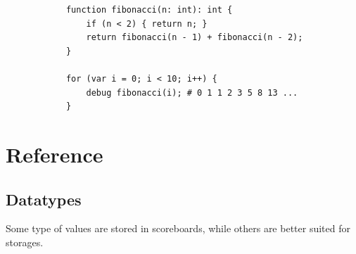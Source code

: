\documentclass[12pt]{article}
\begin{document}
		\begin{lstlisting}
		    function fibonacci(n: int): int {
		        if (n < 2) { return n; }
		        return fibonacci(n - 1) + fibonacci(n - 2);
		    }
		    
		    for (var i = 0; i < 10; i++) {
		        debug fibonacci(i); # 0 1 1 2 3 5 8 13 ...
		    }
		\end{lstlisting}

\section{Reference}
    \subsection{Datatypes}
        Some type of values are stored in scoreboards, while others are better suited for storages.
\end{document}
